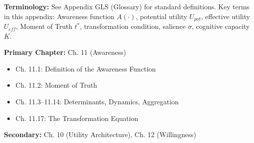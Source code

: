 \begin{tcolorbox}[colback=gray!5!white, colframe=gray!50!black]
\textbf{Terminology:} See Appendix GLS (Glossary) for standard definitions.
Key terms in this appendix: Awareness function $A(\cdot)$, potential utility $U_{pot}$,
effective utility $U_{eff}$, Moment of Truth $t^*$, transformation condition,
salience $\sigma$, cognitive capacity $K$.
\end{tcolorbox}

\begin{tcolorbox}[colback=blue!5!white, colframe=blue!50!black, title=Chapter Linkage]
\textbf{Primary Chapter:} Ch. 11 (Awareness)
\begin{itemize}[nosep]
    \item Ch. 11.1: Definition of the Awareness Function
    \item Ch. 11.2: Moment of Truth
    \item Ch. 11.3--11.14: Determinants, Dynamics, Aggregation
    \item Ch. 11.17: The Transformation Equation
\end{itemize}
\textbf{Secondary:} Ch. 10 (Utility Architecture), Ch. 12 (Willingness)
\end{tcolorbox}

